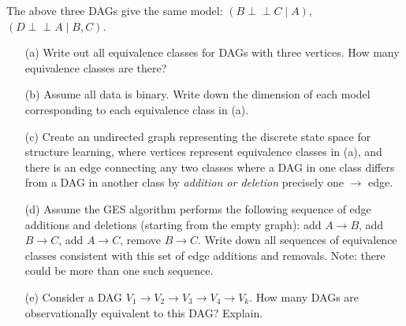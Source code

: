 \documentclass[11pt]{article}
\def\ci{\perp\!\!\!\perp}
\begin{document}
\begin{center}
\end{center}
The above three DAGs give the same model: $(B \ci C \mid A)$, $(D \ci A \mid B,C)$.

\begin{enumerate}
\item[(a)] Write out all equivalence classes for DAGs with three vertices.  How many equivalence classes are there?
\item[(b)] Assume all data is binary.  Write down the dimension of each model corresponding to each equivalence class in (a).
\item[(c)] Create an undirected graph representing the discrete state space for structure learning, where vertices represent equivalence classes in (a), and there is an edge connecting any two classes where a DAG in one class differs from a DAG in another class by \emph{addition or deletion} precisely one $\to$ edge.
\item[(d)] 
Assume the GES algorithm performs the following sequence of edge additions and deletions (starting from the empty graph): add $A\to B$, add $B \to C$, add $A \to C$, remove $B \to C$.
Write down all sequences of equivalence classes consistent with this set of edge additions and removals.  Note: there could be more than one such sequence.

\item[(e)] Consider a DAG $V_1 \to V_2 \to V_3 \to V_4 \to V_k$.  How many DAGs are observationally equivalent to this DAG?  Explain.
\end{enumerate}
\end{document}
